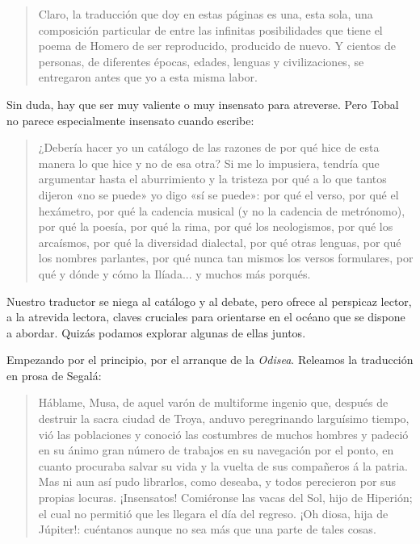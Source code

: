 \begin{quotation}
Claro, la traducción que doy en estas páginas es una, esta sola, una composición particular de entre las infinitas posibilidades que tiene el poema de Homero de ser reproducido, producido de nuevo. Y cientos de personas, de diferentes épocas, edades, lenguas y civilizaciones, se entregaron antes que yo a esta misma labor.
\end{quotation}

Sin duda, hay que ser muy valiente o muy insensato para atreverse.
Pero Tobal no parece especialmente insensato cuando escribe:

\begin{quotation}
¿Debería hacer yo un catálogo de las razones de por qué hice de esta manera lo que hice y no de esa otra? Si me lo impusiera, tendría que argumentar hasta el aburrimiento y la tristeza por qué a lo que tantos dijeron «no se puede» yo digo «sí se puede»: por qué el verso, por qué el hexámetro, por qué la cadencia musical (y no la cadencia de metrónomo), por qué la poesía, por qué la rima, por qué los neologismos, por qué los arcaísmos, por qué la diversidad dialectal, por qué otras lenguas, por qué los nombres parlantes, por qué nunca tan mismos los versos formulares, por qué y dónde y cómo la Ilíada... y muchos más porqués.
\end{quotation}

Nuestro traductor se niega al catálogo y al debate, pero ofrece al perspicaz lector, a la atrevida lectora, claves cruciales para orientarse en el océano que se dispone a abordar. Quizás podamos explorar algunas de ellas juntos.

Empezando por el principio, por el arranque de la \emph{Odisea}. Releamos la traducción en prosa de Segalá:

\begin{quotation}
Háblame, Musa, de aquel varón de multiforme ingenio que, después de
destruir la sacra ciudad de Troya, anduvo peregrinando larguísimo tiempo,
vió las poblaciones y conoció las costumbres de muchos hombres y padeció
en su ánimo gran número de trabajos en su navegación por el ponto, en
cuanto procuraba salvar su vida y la vuelta de sus compañeros á la patria.
Mas ni aun así pudo librarlos, como deseaba, y todos perecieron por sus
propias locuras. ¡Insensatos! Comiéronse las vacas del Sol, hijo de Hiperión; el cual no permitió que les llegara el día del regreso. ¡Oh diosa, hija de
Júpiter!: cuéntanos aunque no sea más que una parte de tales cosas.
\end{quotation}

